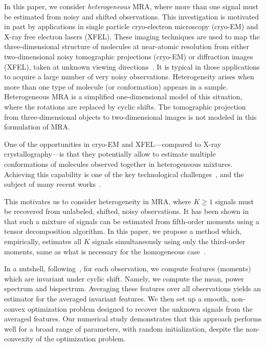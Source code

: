 \documentclass[english]{article}
\numberwithin{equation}{section}
\numberwithin{figure}{section}
\theoremstyle{plain}
\theoremstyle{definition}
\theoremstyle{remark}
\theoremstyle{plain}
\theoremstyle{remark}
\theoremstyle{plain}
\theoremstyle{plain}
\begin{document}
In this paper, we consider \emph{heterogeneous} MRA, where more than one signal must be estimated from noisy and shifted observations. This investigation is motivated in part by applications in single particle cryo-electron microscopy (cryo-EM) and X-ray free electron lasers (XFEL). These imaging techniques are used to map the three-dimensional structure of molecules at near-atomic resolution from either two-dimensional noisy tomographic  projections (cryo-EM) or diffraction images (XFEL),
taken at unknown viewing directions~\cite{bartesaghi20152,mcneil2010x,frank2006three}. %
It is typical in those applications to acquire a large number of very noisy observations. 
Heterogeneity arises when more than one type of molecule (or conformation) appears in a sample.
{Heterogeneous} MRA is a simplified one-dimensional model of this situation, where the rotations are replaced by cyclic shifts. The tomographic projection from three-dimensional objects to two-dimensional images is not modeled in this formulation of MRA.



One of the opportunities in cryo-EM and XFEL---com\-pared to X-ray crystallography---is that they potentially allow to estimate multiple conformations of molecules observed together in heterogeneous mixtures. Achieving this capability is one of the key technological challenges~\cite{nogales2016development}, and the subject of many recent works~\cite{schwander2014conformations,frank2016continuous,katsevich2015covariance,anden2015covariance,lederman2016representation,aizenbud2016max,lederman2017continuously}. 


This motivates us to consider heterogeneity in MRA, where $K \geq 1$ signals must be recovered from unlabeled, shifted, noisy observations. It has been shown in~\cite{perry2017sample} that such a mixture of signals can be estimated from fifth-order moments using a tensor decomposition algorithm. In this paper, we propose a method which, empirically, estimates all $K$ signals simultaneously using only the third-order moments, same as what is necessary for the homogeneous case~\cite{bandeira2017optimal}. %

In a nutshell, following~\cite{bendory2017bispectrum}, for each observation, we compute features (moments) which are invariant under cyclic shift. Namely, we compute the mean, power spectrum and bispectrum. Averaging these features over all observations yields an estimator for the averaged invariant features. We then set up a smooth, non-convex optimization problem designed to recover the unknown signals from the averaged features.
Our numerical study demonstrates that this approach performs well for a broad range of parameters, with random initialization, despite the non-convexity of the optimization problem.
\end{document}
